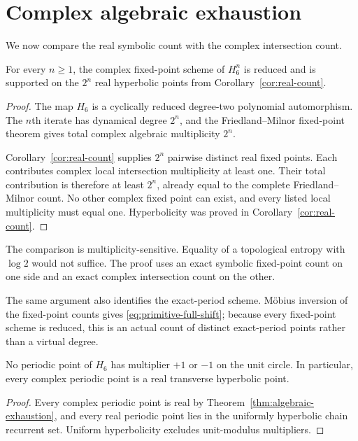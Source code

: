 \section{Complex algebraic exhaustion}\label{sec:exhaustion}

We now compare the real symbolic count with the complex intersection count.

\begin{theorem}\label{thm:algebraic-exhaustion}
For every $n\ge1$, the complex fixed-point scheme of $H_6^n$ is reduced and
is supported on the $2^n$ real hyperbolic points from
Corollary~\ref{cor:real-count}.
\end{theorem}

\begin{proof}
The map $H_6$ is a cyclically reduced degree-two polynomial automorphism.
The $n$th iterate has dynamical degree $2^n$, and the Friedland--Milnor
fixed-point theorem gives total complex algebraic multiplicity $2^n$.

Corollary~\ref{cor:real-count} supplies $2^n$ pairwise distinct real fixed
points.  Each contributes complex local intersection multiplicity at least
one.  Their total contribution is therefore at least $2^n$, already equal
to the complete Friedland--Milnor count.  No other complex fixed point can
exist, and every listed local multiplicity must equal one.  Hyperbolicity was
proved in Corollary~\ref{cor:real-count}.
\end{proof}

\begin{remark}
The comparison is multiplicity-sensitive.  Equality of a topological entropy
with $\log2$ would not suffice.  The proof uses an exact symbolic fixed-point
count on one side and an exact complex intersection count on the other.
\end{remark}

The same argument also identifies the exact-period scheme.  M\"obius
inversion of the fixed-point counts gives \eqref{eq:primitive-full-shift};
because every fixed-point scheme is reduced, this is an actual count of
distinct exact-period points rather than a virtual degree.

\begin{corollary}\label{cor:no-neutral}
No periodic point of $H_6$ has multiplier $+1$ or $-1$ on the unit circle.
In particular, every complex periodic point is a real transverse hyperbolic
point.
\end{corollary}

\begin{proof}
Every complex periodic point is real by
Theorem~\ref{thm:algebraic-exhaustion}, and every real periodic point lies in
the uniformly hyperbolic chain recurrent set.  Uniform hyperbolicity excludes
unit-modulus multipliers.
\end{proof}
